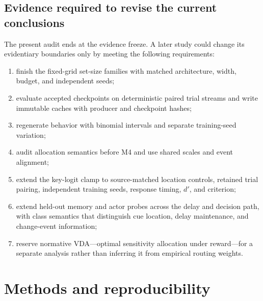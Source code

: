 \documentclass[11pt,a4paper]{article}
\begin{document}
\subsection{Evidence required to revise the current conclusions}
The present audit ends at the evidence freeze. A later study could change its evidentiary boundaries only by meeting the following requirements:
\begin{enumerate}
\item finish the fixed-grid set-size families with matched architecture, width, budget, and independent seeds;
\item evaluate accepted checkpoints on deterministic paired trial streams and write immutable caches with producer and checkpoint hashes;
\item regenerate behavior with binomial intervals and separate training-seed variation;
\item audit allocation semantics before M4 and use shared scales and event alignment;
\item extend the key-logit clamp to source-matched location controls, retained trial pairing, independent training seeds, response timing, $d'$, and criterion;
\item extend held-out memory and actor probes across the delay and decision path, with class semantics that distinguish cue location, delay maintenance, and change-event information;
\item reserve normative VDA---optimal sensitivity allocation under reward---for a separate analysis rather than inferring it from empirical routing weights.
\end{enumerate}

\section{Methods and reproducibility}
\end{document}
